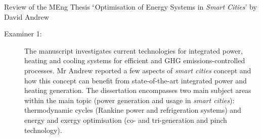 \documentclass[14pt,twoside]{report}
\begin{document}
\clearpage




\bigskip

\begin{center}
  {\Large Review of the MEng Thesis $\lq$Optimisation of Energy Systems in {\it Smart Cities}' by David Andrew}
\end{center}

\begin{description}
\item[Examiner 1:]

The manuscript investigates current technologies for integrated power, heating and cooling systems for efficient and GHG emissions-controlled processes. Mr Andrew reported a few aspects of {\it smart cities} concept and how this concept can benefit from state-of-the-art integrated power and heating generation. The dissertation encompasses two main subject areas within the main topic (power generation and usage in {\it smart cities}): thermodynamic cycles (Rankine power and refrigeration systems) and energy and exergy optimisation (co- and tri-generation and pinch technology).


\end{description}
\end{document}
